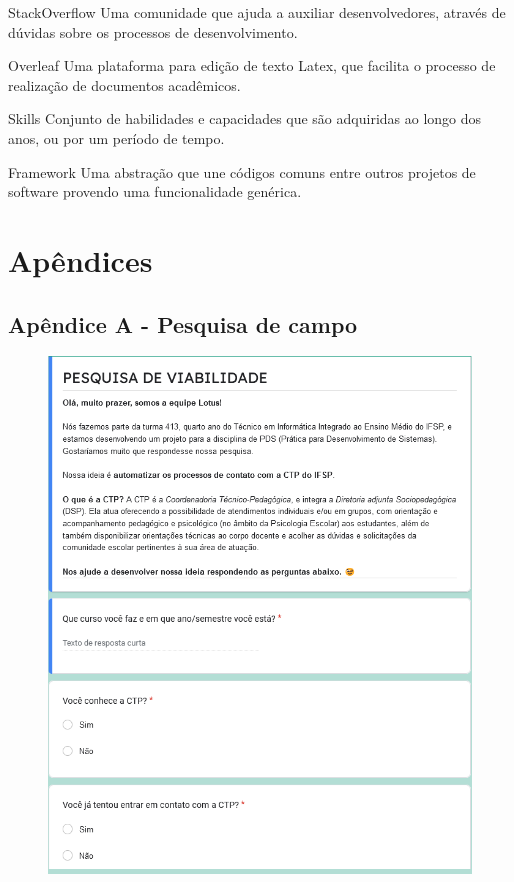 \documentclass[12pt,a4paper]{article}
\begin{document}
         StackOverflow 
        Uma comunidade que ajuda a auxiliar desenvolvedores, através de dúvidas sobre os processos de desenvolvimento.
        
        Overleaf
        Uma plataforma para edição de texto Latex, que facilita o processo de realização de documentos acadêmicos.
        
         Skills 
        Conjunto de habilidades e capacidades que são adquiridas ao longo dos anos, ou por um período de tempo.
        
        Framework 
        Uma abstração que une códigos comuns entre outros projetos de software provendo uma funcionalidade genérica.
        
\newpage

\section{Apêndices}
\subsection{Apêndice A - Pesquisa de campo}

\begin{figure}[H]
    \centering
     \includegraphics[width=15cm]{foto1.png}
\end{figure}
\end{document}

